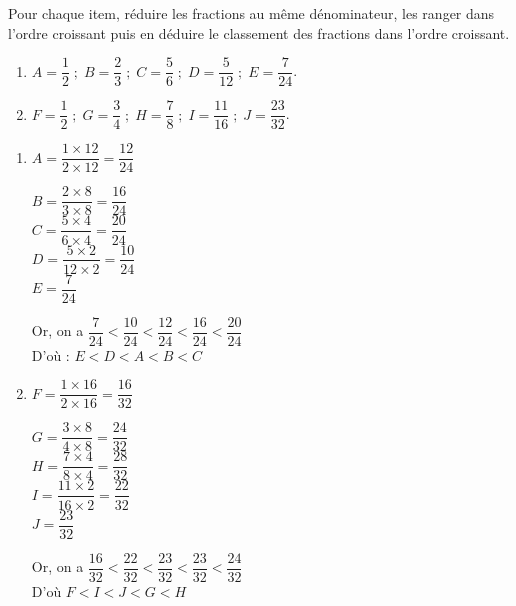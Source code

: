 \begin{exercice*}
   Pour chaque item, réduire les fractions au même dénominateur, les ranger dans l'ordre croissant puis en déduire le classement des fractions dans l'ordre croissant. \\ [-2mm]
   \begin{enumerate}
      \item $A =\dfrac12 \; ; \; B =\dfrac23 \; ; \; C =\dfrac56 \; ; \; D = \dfrac5{12} \; ; \; E =\dfrac7{24}$. \medskip
      \item $F =\dfrac12 \; ; \; G =\dfrac34 \; ; \; H =\dfrac78 \; ; \; I = \dfrac{11}{16} \; ; \; J =\dfrac{23}{32}$.
   \end{enumerate}
 \end{exercice*}
 \begin{corrige}
   \begin{enumerate}
      \item $A =\dfrac{1\times12}{2\times12} =\dfrac{12}{24}$ \\ [2mm]
      \begin{multicols}{2}
         $B =\dfrac{2\times8}{3\times8} =\dfrac{16}{24}$ \\ [2mm]
         $C =\dfrac{5\times4}{6\times4} =\dfrac{20}{24}$ \\ [2mm]
         $D = \dfrac{5\times2}{12\times2} =\dfrac{10}{24}$ \\ [2mm]
         $E =\dfrac{7}{24}$ \\ [2mm]
      \end{multicols}
         Or, on a $\dfrac{7}{24}<\dfrac{10}{24}<\dfrac{12}{24}<\dfrac{16}{24}<\dfrac{20}{24}$ \\ [2mm]
         D'où : {\red $E<D<A<B<C$} \\ [2mm]
      \item $F =\dfrac{1\times16}{2\times16} =\dfrac{16}{32}$ \\ [2mm]
      \begin{multicols}{2}
         $G =\dfrac{3\times8}{4\times8} =\dfrac{24}{32}$ \\ [2mm]
         $H =\dfrac{7\times4}{8\times4} =\dfrac{28}{32}$ \\ [2mm]
         $I = \dfrac{11\times2}{16\times2} =\dfrac{22}{32}$ \\ [2mm]
         $J =\dfrac{23}{32}$ \\ [2mm]
      \end{multicols}
         Or, on a $\dfrac{16}{32}<\dfrac{22}{32}<\dfrac{23}{32}<\dfrac{23}{32}<\dfrac{24}{32}$ \\ [2mm]
         D'où {\red $F<I<J<G<H$}
   \end{enumerate}
 \end{corrige}